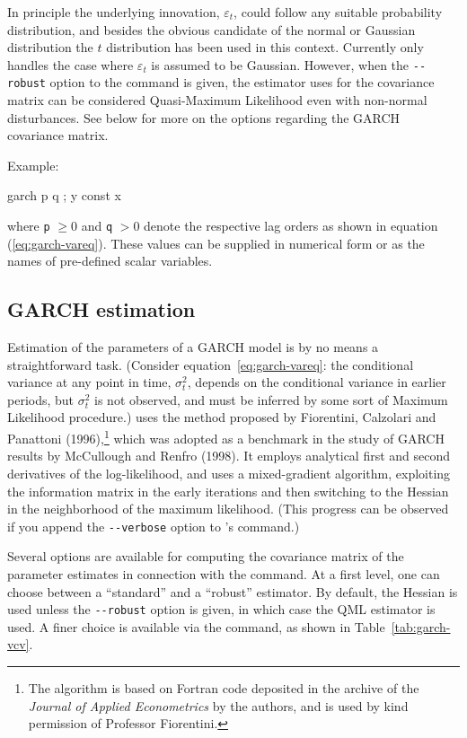 In principle the underlying innovation, $\varepsilon_t$, could follow
any suitable probability distribution, and besides the obvious
candidate of the normal or Gaussian distribution the $t$ distribution
has been used in this context.  Currently  only handles the
case where $\varepsilon_t$ is assumed to be Gaussian.  However, when
the \verb|--robust| option to the  command is given, the
estimator  uses for the covariance matrix can be considered
Quasi-Maximum Likelihood even with non-normal disturbances.  See below
for more on the options regarding the GARCH covariance matrix.

Example:
\begin{code}
  garch p q ; y const x
\end{code}
where \verb|p| $\ge 0$ and \verb|q| $>0$ denote the respective lag
orders as shown in equation (\ref{eq:garch-vareq}).  These values
can be supplied in numerical form or as the names of pre-defined
scalar variables.

\subsection{GARCH estimation}
\label{subsec:garch-est}

Estimation of the parameters of a GARCH model is by no means a
straightforward task.  (Consider equation~\ref{eq:garch-vareq}: the
conditional variance at any point in time, $\sigma^2_t$, depends on
the conditional variance in earlier periods, but $\sigma^2_t$ is not
observed, and must be inferred by some sort of Maximum Likelihood
procedure.)   uses the method proposed by Fiorentini,
Calzolari and Panattoni (1996),\footnote{The algorithm is based on
  Fortran code deposited in the archive of the \textit{Journal of
    Applied Econometrics} by the authors, and is used by kind
  permission of Professor Fiorentini.}  which was adopted as a
benchmark in the study of GARCH results by McCullough and Renfro
(1998).  It employs analytical first and second derivatives of the
log-likelihood, and uses a mixed-gradient algorithm, exploiting the
information matrix in the early iterations and then switching to the
Hessian in the neighborhood of the maximum likelihood.  (This progress
can be observed if you append the \verb|--verbose| option to
's  command.)

Several options are available for computing the covariance matrix of
the parameter estimates in connection with the  command.
At a first level, one can choose between a ``standard'' and a
``robust'' estimator.  By default, the Hessian is used unless the
\verb|--robust| option is given, in which case the QML estimator is
used.  A finer choice is available via the  command, as
shown in Table~\ref{tab:garch-vcv}.

